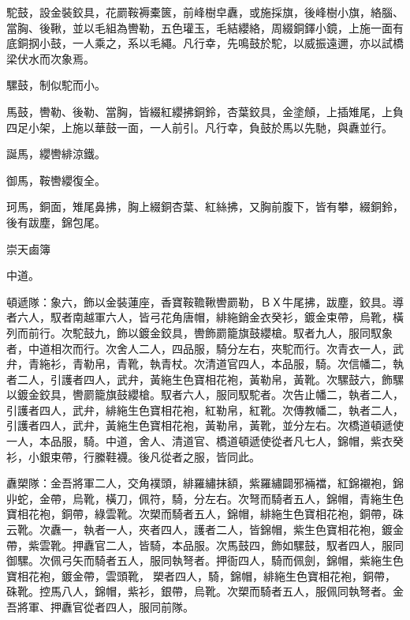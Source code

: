 \begin{pinyinscope}
 駝鼓，設金裝鉸具，花罽鞍褥橐篋，前峰樹皁纛，或施採旗，後峰樹小旗，絡腦、當胸、後鞦，並以毛組為轡勒，五色瓘玉，毛結纓絡，周綴銅鐸小鏡，上施一面有底銅㧏小鼓，一人乘之，系以毛繩。凡行幸，先鳴鼓於駝，以威振遠邇，亦以試橋梁伏水而次象焉。



 騾鼓，制似駝而小。



 馬鼓，轡勒、後勒、當胸，皆綴紅纓拂銅鈴，杏葉鉸具，金塗頠，上插雉尾，上負四足小架，上施以華鼓一面，一人前引。凡行幸，負鼓於馬以先馳，與纛並行。



 誕馬，纓轡緋涼鐵。



 御馬，鞍轡纓復全。



 珂馬，銅面，雉尾鼻拂，胸上綴銅杏葉、紅絲拂，又胸前腹下，皆有攀，綴銅鈴，後有跋塵，錦包尾。



 崇天鹵簿



 中道。



 頓遞隊：象六，飾以金裝蓮座，香寶鞍韂鞦轡罽勒，ＢＸ牛尾拂，跋塵，鉸具。導者六人，馭者南越軍六人，皆弓花角唐帽，緋絁銷金衣癸衫，鍍金束帶，烏靴，橫列而前行。次駝鼓九，飾以鍍金鉸具，轡飾罽籠旗鼓纓槍。馭者九人，服同馭象者，中道相次而行。次舍人二人，四品服，騎分左右，夾駝而行。次青衣一人，武弁，青絁衫，青勒帛，青靴，執青杖。次清道官四人，本品服，騎。次信幡二，執者二人，引護者四人，武弁，黃絁生色寶相花袍，黃勒帛，黃靴。次騾鼓六，飾騾以鍍金鉸具，轡罽籠旗鼓纓槍。馭者六人，服同馭駝者。次告止幡二，執者二人，引護者四人，武弁，緋絁生色寶相花袍，紅勒帛，紅靴。次傳教幡二，執者二人，引護者四人，武弁，黃絁生色寶相花袍，黃勒帛，黃靴，並分左右。次橋道頓遞使一人，本品服，騎。中道，舍人、清道官、橋道頓遞使從者凡七人，錦帽，紫衣癸衫，小銀束帶，行縢鞋襪。後凡從者之服，皆同此。



 纛槊隊：金吾將軍二人，交角襆頭，緋羅繡抹額，紫羅繡闢邪裲襠，紅錦襯袍，錦丱蛇，金帶，烏靴，橫刀，佩符，騎，分左右。次弩而騎者五人，錦帽，青絁生色寶相花袍，銅帶，綠雲靴。次槊而騎者五人，錦帽，緋絁生色寶相花袍，銅帶，硃云靴。次纛一，執者一人，夾者四人，護者二人，皆錦帽，紫生色寶相花袍，鍍金帶，紫雲靴。押纛官二人，皆騎，本品服。次馬鼓四，飾如騾鼓，馭者四人，服同御騾。次佩弓矢而騎者五人，服同執弩者。押衙四人，騎而佩劍，錦帽，紫絁生色寶相花袍，鍍金帶，雲頭靴，槊者四人，騎，錦帽，緋絁生色寶相花袍，銅帶，硃靴。控馬八人，錦帽，紫衫，銀帶，烏靴。次槊而騎者五人，服佩同執弩者。金吾將軍、押纛官從者四人，服同前隊。




\end{pinyinscope}
